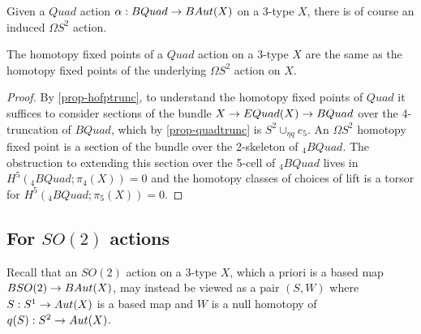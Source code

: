 \documentclass{amsart}
\begin{document}
Given a $Quad$ action $\alpha: BQuad \rightarrow BAut(X)$ on a 3-type $X$, there is of course an induced $\Omega S^2$ action.

\begin{proposition} 
\label{prop-quadvs2fp}
The homotopy fixed points of a $Quad$ action on a 3-type $X$ are the same as the homotopy fixed points of the underlying $\Omega S^2$ action on $X$.
\end{proposition}
\begin{proof}
By \cref{prop-hofptrunc}, to understand the homotopy fixed points of $Quad$ it suffices to consider sections of the bundle $X \rightarrow EQuad(X) \rightarrow BQuad$ over the 4-truncation of $BQuad$, which by \cref{prop-quadtrunc} is $S^2 \cup_{\eta q} e_5$.  An $\Omega S^2$ homotopy fixed point is a section of the bundle over the 2-skeleton of ${}_4 BQuad$.  The obstruction to extending this section over the 5-cell of ${}_4 BQuad$ lives in $H^5({}_4 BQuad;\pi_4(X)) = 0$ and the homotopy classes of choices of lift is a torsor for $H^5({}_4 BQuad;\pi_5(X)) = 0$.
\end{proof}


\subsection{For $SO(2)$ actions}

Recall that an $SO(2)$ action on a 3-type $X$, which a priori is a based map $BSO(2) \rightarrow BAut(X)$, may instead be viewed as a pair $(S,W)$ where $S : S^1 \rightarrow Aut(X)$ is a based map and $W$ is a null homotopy of $q(S): S^2 \to Aut(X)$.
\end{document}
